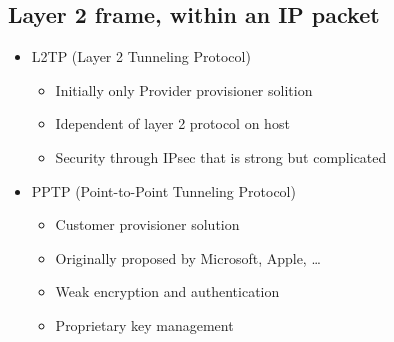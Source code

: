 \documentclass{article}
\begin{document}
\subsection{Layer 2 frame, within an IP packet}
\begin{itemize}
    \item L2TP (Layer 2 Tunneling Protocol)
    \begin{itemize}
        \item Initially only Provider provisioner solition
        \item Idependent of layer 2 protocol on host
        \item Security through IPsec that is strong but complicated
    \end{itemize}
    \item PPTP (Point-to-Point Tunneling Protocol)
    \begin{itemize}
        \item Customer provisioner solution
        \item Originally proposed by Microsoft, Apple, …
        \item Weak encryption and authentication
        \item Proprietary key management
    \end{itemize}
\end{itemize}
\end{document}
